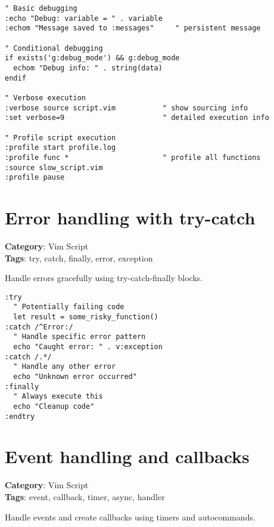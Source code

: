 {{{{{{{{{{{{{{{{{{\begin{Exa*}{}
\begin{Verbatim}[fontsize=\footnotesize, breaklines, breakanywhere]
" Basic debugging
:echo "Debug: variable = " . variable
:echom "Message saved to :messages"     " persistent message

" Conditional debugging
if exists('g:debug_mode') && g:debug_mode
  echom "Debug info: " . string(data)
endif

" Verbose execution
:verbose source script.vim           " show sourcing info
:set verbose=9                       " detailed execution info

" Profile script execution
:profile start profile.log
:profile func *                      " profile all functions
:source slow_script.vim
:profile pause
\end{Verbatim}
\end{Exa*}

\section{Error handling with try-catch}

\textbf{Category}: Vim Script\\ \textbf{Tags}: try, catch, finally, error, exception
\vspace{0.5cm}

Handle errors gracefully using try-catch-finally blocks.

\begin{Exa*}{}
\begin{Verbatim}[fontsize=\footnotesize, breaklines, breakanywhere]
:try
  " Potentially failing code
  let result = some_risky_function()
:catch /^Error:/
  " Handle specific error pattern
  echo "Caught error: " . v:exception
:catch /.*/
  " Handle any other error
  echo "Unknown error occurred"
:finally
  " Always execute this
  echo "Cleanup code"
:endtry
\end{Verbatim}
\end{Exa*}

\section{Event handling and callbacks}

\textbf{Category}: Vim Script\\ \textbf{Tags}: event, callback, timer, async, handler
\vspace{0.5cm}

Handle events and create callbacks using timers and autocommands.

}}}}}}}}}}}}}}}}}}
